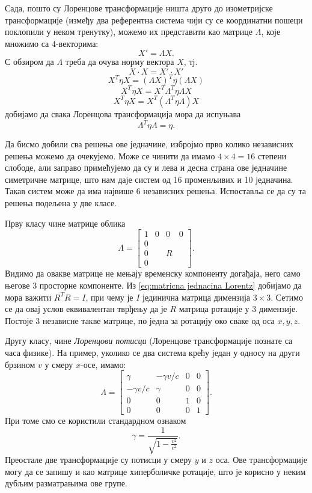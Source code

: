 \documentclass{report}
\theoremstyle{plain}
\theoremstyle{definition}
\begin{document}
Сада, пошто су Лоренцове трансформације ништа друго до изометријске трансформације (између два референтна система чији су се координатни пошеци поклопили у неком тренутку), можемо их представити као матрице $\Lambda$, које множимо са 4-векторима:
$$X' = \Lambda X.$$
С обзиром да $\Lambda$ треба да очува норму вектора $X$, тј.
$$ X\cdot X = X'\cdot X'$$
$$X^T\eta X = (\Lambda X)^T\eta (\Lambda X)$$
$$X^T\eta X = X^T \Lambda^T\eta \Lambda X$$
$$X^T\eta X = X^T (\Lambda^T\eta \Lambda) X$$
добијамо да свака Лоренцова трансформација мора да испуњава
\label{dokaz za pseudoortogonalnu kvadratnu formu}
\begin{equation}
\label{eq:matricna jednacina Lorentz}
\Lambda^T \eta \Lambda = \eta. \tag{*}
\end{equation}

Да бисмо добили сва решења ове једначине, избројмо прво колико независних решења можемо да очекујемо. Може се чинити да имамо $4\times 4 = 16$ степени слободе, али заправо примећујемо да су и лева и десна страна ове једначине симетричне матрице, што нам даје систем од 16 променљивих и 10 једначина. Такав систем може да има највише 6 независних решења. Испоставља се да су та решења подељена у две класе.

Прву класу чине матрице облика
$$\Lambda = \begin{bmatrix}
    1 & 0 & 0 & 0 \\
    0 &   &   &   \\
    0 &   & R &   \\
    0 &   &   &
  \end{bmatrix}.$$
Видимо да овакве матрице не мењају временску компоненту догађаја, него само његове 3 просторне компоненте. Из \eqref{eq:matricna jednacina Lorentz} добијамо да мора важити $R^T R = I$, при чему је $I$ јединична матрица димензија $3\times 3$. Сетимо се да овај услов еквивалентан тврђењу да је $R$ матрица ротације у 3 димензије. Постоје 3 независне такве матрице, по једна за ротацију око сваке од оса $x, y, z$.

Другу класу, чине \emph{Лоренцови потисци} (Лоренцове трансформације познате са часа физике). На пример, уколико се два система крећу један у односу на други брзином $v$ у смеру $x$-осе, имамо:
$$\Lambda = \begin{bmatrix}
    \gamma & -\gamma v/c & 0 & 0 \\
    -\gamma v/c & \gamma & 0 & 0 \\
    0 &  0 & 1 & 0  \\
    0 & 0  & 0 & 1
  \end{bmatrix}.$$
При томе смо се користили стандардном ознаком
$$\gamma = \frac{1}{\sqrt{1-\frac{v^2}{c^2}}}.$$
Преостале две трансформације су потисци у смеру $y$ и $z$ оса. Ове трансформације могу да се запишу и као матрице хиперболичке ротације, што је корисно у неким дубљим разматрањима ове групе.
\end{document}
